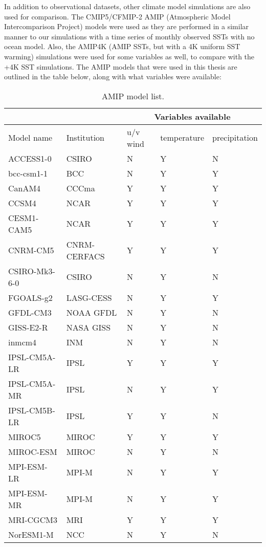 \documentclass[letterpaper,12pt,titlepage,oneside,final]{book}
\begin{document}
In addition to observational datasets, other climate model simulations are also used for comparison. The CMIP5/CFMIP-2 AMIP (Atmospheric Model Intercomparison Project) \citep{bony_cfmip:_2011} models were used as they are performed in a similar manner to our simulations with a time series of monthly observed SSTs with no ocean model. Also, the AMIP4K (AMIP SSTs, but with a 4K uniform SST warming) simulations were used for some variables as well, to compare with the +4K SST simulations. The AMIP models that were used in this thesis are outlined in the table below, along with what variables were available:

\begin{table}[H]
\caption{AMIP model list.}
\label{tab:amip}
\begin{tabular}{|p{4cm}||p{3.5cm}|p{2cm}|p{2.25cm}|p{2.25cm}|}
\hline
&&\multicolumn{3}{|c|}{Variables available}\\
\hline
Model name&Institution&u/v wind&temperature&precipitation\\ \hline
ACCESS1-0&CSIRO&N&Y&N\\   \hline
bcc-csm1-1&BCC&N&Y&Y\\ \hline
CanAM4&CCCma&Y&Y&Y\\ \hline
CCSM4&NCAR&Y&Y&Y\\ \hline
CESM1-CAM5&NCAR&Y&Y&Y\\ \hline
CNRM-CM5&CNRM-CERFACS&Y&Y&Y\\ \hline
CSIRO-Mk3-6-0&CSIRO&N&Y&N\\ \hline
FGOALS-g2&LASG-CESS&N&Y&Y\\ \hline
GFDL-CM3&NOAA GFDL&N&Y&N\\ \hline
GISS-E2-R&NASA GISS&N&Y&N\\ \hline
inmcm4&INM&N&Y&N\\ \hline
IPSL-CM5A-LR&IPSL&Y&Y&Y\\ \hline
IPSL-CM5A-MR&IPSL&N&Y&Y\\ \hline
IPSL-CM5B-LR&IPSL&Y&Y&N\\ \hline
MIROC5&MIROC&Y&Y&Y\\ \hline
MIROC-ESM&MIROC&N&Y&N\\ \hline
MPI-ESM-LR&MPI-M&N&Y&Y\\ \hline
MPI-ESM-MR&MPI-M&N&Y&Y\\ \hline
MRI-CGCM3&MRI&Y&Y&Y\\ \hline
NorESM1-M&NCC&N&Y&N\\ \hline

\end{tabular}
\end{table}
\end{document}
